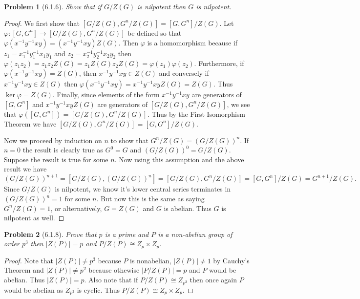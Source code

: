 \documentclass{article}
\newtheorem{problem}{Problem}
\begin{document}
\begin{problem}[6.1.6]
Show that if $G/Z(G)$ is nilpotent then $G$ is nilpotent.
\end{problem}
\begin{proof}
We first show that $[G/Z(G), G^n/Z(G)] = [G, G^n]/Z(G)$. Let $\varphi : [G, G^n] \to [G/Z(G), G^n/Z(G)]$ be defined so that $\varphi(x^{-1}y^{-1}xy) = (x^{-1}y^{-1}xy)Z(G)$. Then $\varphi$ is a homomorphism because if $z_1 = x_1^{-1}y_1^{-1}x_1y_1$ and $z_2 = x_2^{-1}y_2^{-1}x_2y_2$ then $\varphi(z_1z_2) = z_1z_2Z(G) = z_1Z(G)z_2Z(G) = \varphi(z_1)\varphi(z_2)$. Furthermore, if $\varphi(x^{-1}y^{-1}xy) = Z(G)$, then $x^{-1}y^{-1}xy \in Z(G)$ and conversely if $x^{-1}y^{-1}xy \in Z(G)$ then $\varphi(x^{-1}y^{-1}xy) = x^{-1}y^{-1}xyZ(G) = Z(G)$. Thus $\ker \varphi = Z(G)$. Finally, since elements of the form $x^{-1}y^{-1}xy$ are generators of $[G, G^n]$ and $x^{-1}y^{-1}xyZ(G)$ are generators of $[G/Z(G), G^n/Z(G)]$, we see that $\varphi([G, G^n]) = [G/Z(G), G^n/Z(G)]$. Thus by the First Isomorphism Theorem we have $[G/Z(G), G^n/Z(G)] = [G, G^n]/Z(G)$.

Now we proceed by induction on $n$ to show that $G^n/Z(G) = (G/Z(G))^n$. If $n = 0$ the result is clearly true as $G^0 = G$ and $(G/Z(G))^0 = G/Z(G)$. Suppose the result is true for some $n$. Now using this assumption and the above result we have
\[
(G/Z(G))^{n+1} = [G/Z(G), (G/Z(G))^n] = [G/Z(G), G^n/Z(G)] = [G, G^n]/Z(G) = G^{n+1}/Z(G).
\]
Since $G/Z(G)$ is nilpotent, we know it's lower central series terminates in $(G/Z(G))^n = 1$ for some $n$. But now this is the same as saying $G^n/Z(G) = 1$, or alternatively, $G = Z(G)$ and $G$ is abelian. Thus $G$ is nilpotent as well.
\end{proof} 

\begin{problem}[6.1.8]
Prove that $p$ is a prime and $P$ is a non-abelian group of order $p^3$ then $|Z(P)| = p$ and $P/Z(P) \cong Z_p \times Z_p$.
\end{problem}
\begin{proof}
Note that $|Z(P)| \neq p^3$ because $P$ is nonabelian, $|Z(P)| \neq 1$ by Cauchy's Theorem and $|Z(P)| \neq p^2$ because othewise $|P/Z(P)| = p$ and $P$ would be abelian. Thus $|Z(P)| = p$. Also note that if $P/Z(P) \cong Z_{p^2}$ then once again $P$ would be abelian as $Z_{p^2}$ is cyclic. Thus $P/Z(P) \cong Z_p \times Z_p$.
\end{proof}
\end{document}
